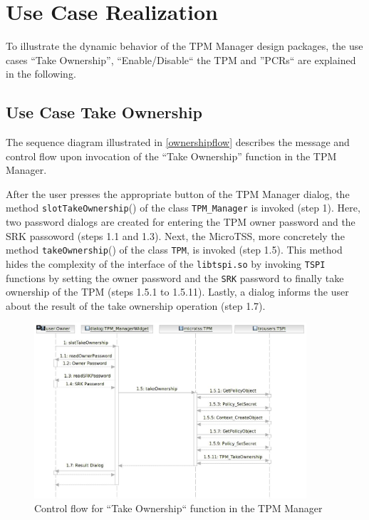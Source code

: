 \documentclass[
  american        %
]{sirrixreport}
\begin{document}
\section{Use Case Realization} 
\label{sec:usecase}
To illustrate the dynamic behavior of the TPM Manager design packages, the use cases ``Take Ownership'', ``Enable/Disable`` the TPM and ''PCRs`` are
explained in the following.

\subsection{Use Case Take Ownership}
\label{sec:takeowner}
The sequence diagram illustrated in \autoref{ownershipflow} describes the message and
control flow upon invocation of the ``Take Ownership'' function in the TPM Manager.

After the user presses the appropriate button of the TPM Manager dialog, the method \lstinline'slotTakeOwnership'()
of the class \lstinline'TPM_Manager' is invoked (step 1). Here, two password dialogs are created for entering
the TPM owner password and the SRK passoword (steps 1.1 and 1.3). Next, the MicroTSS,
more concretely the method \lstinline'takeOwnership'() of the class \lstinline'TPM', is invoked (step 1.5). This method
hides the complexity of the interface of the \lstinline'libtspi.so' by invoking \lstinline'TSPI' functions by setting the owner password and the \lstinline'SRK' password to finally take ownership of the TPM (steps 1.5.1 to 1.5.11). Lastly, a dialog informs the user about the result 
of the take ownership operation (step 1.7).

\begin{figure}[h]
 \centering
 \includegraphics[width=0.9\textwidth]{images/uc50_flow.jpg}
 \caption{Control flow for ``Take Ownership`` function in the TPM Manager}
 \label{ownershipflow}
\end{figure}
\clearpage
\end{document}
